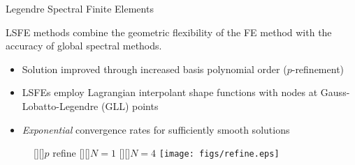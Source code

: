 \documentclass[dvips,xcolor=cmyk]{beamer}
\begin{document}
\begin{frame}{Legendre Spectral Finite Elements}
\normalsize

LSFE methods combine the geometric flexibility of
the FE method with the accuracy of global spectral methods.
%
\begin{itemize}
%
   \item Solution improved through increased basis polynomial order
($p$-refinement)
%
    \item LSFEs employ Lagrangian interpolant shape functions with nodes at
Gauss-Lobatto-Legendre (GLL) points 
%
  \item \textit{Exponential} convergence rates for sufficiently
smooth solutions
%
\end{itemize}

\begin{figure}[h!tp]
   [][]{$p$ refine}
   [][]{$N=1$}
   [][]{$N=4$}
   \texttt{[image: figs/refine.eps]}
\end{figure}

\end{frame}

\end{document}
